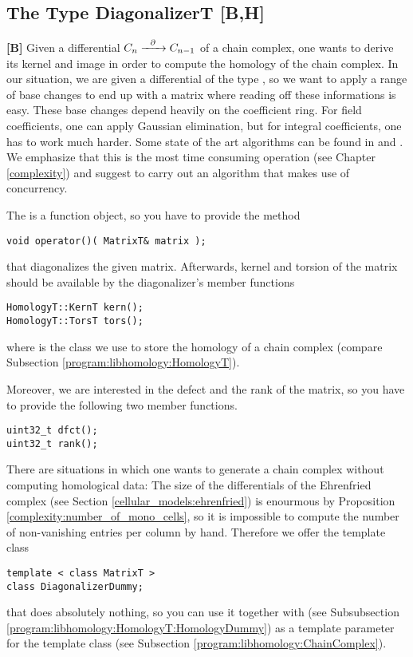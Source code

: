 \subsection{The Type DiagonalizerT [B,H]}
\label{program:libhomology:DiagonalizerT}
{\bf [B]}
Given a differential $C_n \xrightarrow{\hspace{6pt}{\partial}\hspace{6pt}} C_{n-1}$ of a chain complex, one wants to derive its kernel and image in order to compute the homology of the chain complex.
In our situation, we are given a differential of the type , so we want to apply a range of base changes to end up with a matrix where reading off these informations is easy.
These base changes depend heavily on the coefficient ring.
For field coefficients, one can apply Gaussian elimination, but for integral coefficients, one has to work much harder.
Some state of the art algorithms can be found in \cite{Jaeger2003} and \cite{Jaeger2009}.
We emphasize that this is the most time consuming operation (see Chapter \ref{complexity}) and suggest to carry out an algorithm that makes use of concurrency.

The  is a function object, so you have to provide the method
\begin{lstlisting}
void operator()( MatrixT& matrix );
\end{lstlisting}
that diagonalizes the given matrix.
Afterwards, kernel and torsion of the matrix should be available by the diagonalizer's member functions
\begin{lstlisting}
HomologyT::KernT kern();
HomologyT::TorsT tors();
\end{lstlisting}
where  is the class we use to store the homology of a chain complex (compare Subsection \ref{program:libhomology:HomologyT}).

Moreover, we are interested in the defect and the rank of the matrix, so you have to provide the following two member functions.
\begin{lstlisting}
uint32_t dfct();
uint32_t rank();
\end{lstlisting}

\label{program:libhomology:DiagonalizerT:DiagonalizerDummy}

There are situations in which one wants to generate a chain complex without computing homological data:
The size of the differentials of the Ehrenfried complex (see Section \ref{cellular_models:ehrenfried}) is enourmous by Proposition \ref{complexity:number_of_mono_cells},
so it is impossible to compute the number of non-vanishing entries per column by hand.
Therefore we offer the template class
\begin{lstlisting}
template < class MatrixT >
class DiagonalizerDummy;
\end{lstlisting}
that does absolutely nothing, so you can use it together with  (see Subsubsection \ref{program:libhomology:HomologyT:HomologyDummy})
as a template parameter for the template class  (see Subsection \ref{program:libhomology:ChainComplex}).

